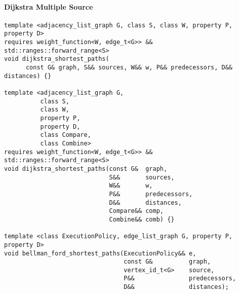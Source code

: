 \paragraph{Dijkstra Multiple Source}
\begin{lstlisting}
template <adjacency_list_graph G, class S, class W, property P, property D>
requires weight_function<W, edge_t<G>> && std::ranges::forward_range<S>
void dijkstra_shortest_paths(
      const G& graph, S&& sources, W&& w, P&& predecessors, D&& distances) {}

template <adjacency_list_graph G,
          class S,
          class W,
          property P,
          property D,
          class Compare,
          class Combine>
requires weight_function<W, edge_t<G>> && std::ranges::forward_range<S>
void dijkstra_shortest_paths(const G&  graph,
                             S&&       sources,
                             W&&       w,
                             P&&       predecessors,
                             D&&       distances,
                             Compare&& comp,
                             Combine&& comb) {}

template <class ExecutionPolicy, edge_list_graph G, property P, property D>
void bellman_ford_shortest_paths(ExecutionPolicy&& e,
                                 const G&          graph,
                                 vertex_id_t<G>    source,
                                 P&&               predecessors,
                                 D&&               distances);

\end{lstlisting}


